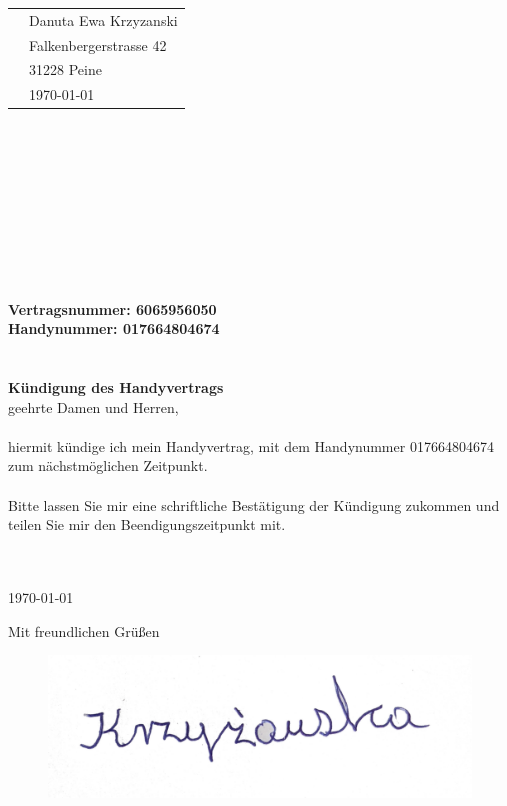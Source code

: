 \documentclass{letter}
\begin{document}
\begin{letter}{}
\begin{tabular}{@{}p{3.0in}l}
& Danuta Ewa Krzyzanski\\
& Falkenbergerstrasse 42\\
& 31228 Peine\\
& \today
\end{tabular}\\ \\ \\ \\
\bigskip
\\
\\
\\
\\
\\
\textbf{Vertragsnummer: 6065956050}\\
\textbf{Handynummer: 017664804674}\\
\\
\\
\Large\textbf{K\"undigung des Handyvertrags}\\
\bigskip
\normalsize
\Sehr geehrte Damen und Herren, \\\\
hiermit kündige ich mein Handyvertrag, mit dem Handynummer 017664804674\\ zum nächstmöglichen Zeitpunkt.\\\\
Bitte lassen Sie mir eine schriftliche Bestätigung der Kündigung zukommen und teilen Sie mir den Beendigungszeitpunkt mit.\\ \\
\\
\bigskip

\today
 
\closing{Mit freundlichen Grüßen}
\begin{figure}
  \includegraphics[width=0.5\linewidth]{podpis.jpg}
\end{figure}



\end{letter}
\end{document}
